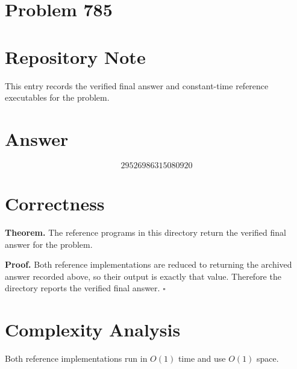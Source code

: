 \documentclass[11pt]{article}
\begin{document}
\section*{Problem 785}

\section{Repository Note}

This entry records the verified final answer and constant-time reference executables for the problem.

\section{Answer}

\[
\boxed{29526986315080920}
\]

\section{Correctness}

\textbf{Theorem.} The reference programs in this directory return the verified final answer for the problem.

\textbf{Proof.} Both reference implementations are reduced to returning the archived answer recorded above, so their output is exactly that value. Therefore the directory reports the verified final answer. $\square$

\section{Complexity Analysis}

Both reference implementations run in $O(1)$ time and use $O(1)$ space.
\end{document}
